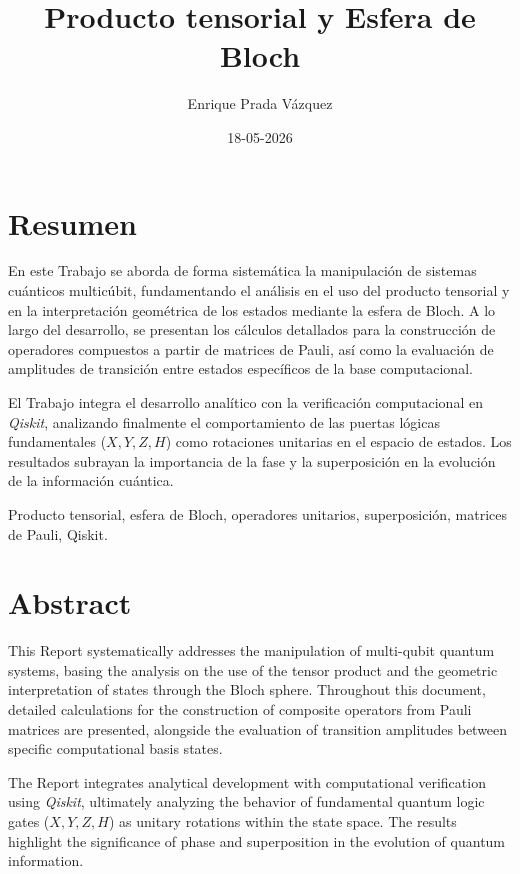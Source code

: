 \documentclass[11pt,a4paper,spanish]{book}
\title{Producto tensorial y Esfera de Bloch}
\author{Enrique Prada Vázquez}
\date{18-05-2026}
\begin{document}
\renewcommand{\listfigurename}{Índice de figuras}
\renewcommand{\listtablename}{Índice de tablas}
\renewcommand{\contentsname}{Índice de contenidos}
\renewcommand{\figurename}{Figura}
\renewcommand{\tablename}{Tabla} 

\maketitle
\frontmatter
\tableofcontents
\listoffigures
\listoftables

\chapter*{Resumen}

En este Trabajo se aborda de forma sistemática la manipulación de sistemas cuánticos multicúbit, fundamentando el análisis en el uso del producto tensorial y en la interpretación geométrica de los estados mediante la esfera de Bloch. A lo largo del desarrollo, se presentan los cálculos detallados para la construcción de operadores compuestos a partir de matrices de Pauli, así como la evaluación de amplitudes de transición entre estados específicos de la base computacional. 

El Trabajo integra el desarrollo analítico con la verificación computacional en \textit{Qiskit}, analizando finalmente el comportamiento de las puertas lógicas fundamentales ($X, Y, Z, H$) como rotaciones unitarias en el espacio de estados. Los resultados subrayan la importancia de la fase y la superposición en la evolución de la información cuántica.

\vspace{0.5cm}
 Producto tensorial, esfera de Bloch, operadores unitarios, superposición, matrices de Pauli, Qiskit.

\chapter*{Abstract}

This Report systematically addresses the manipulation of multi-qubit quantum systems, basing the analysis on the use of the tensor product and the geometric interpretation of states through the Bloch sphere. Throughout this document, detailed calculations for the construction of composite operators from Pauli matrices are presented, alongside the evaluation of transition amplitudes between specific computational basis states. 

The Report integrates analytical development with computational verification using \textit{Qiskit}, ultimately analyzing the behavior of fundamental quantum logic gates ($X, Y, Z, H$) as unitary rotations within the state space. The results highlight the significance of phase and superposition in the evolution of quantum information.
\end{document}
